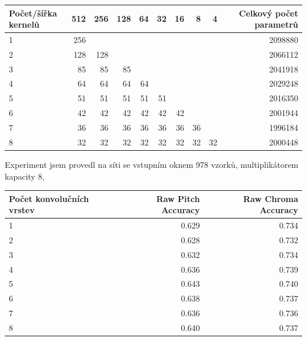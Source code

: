    \begin{tabular}{lrrrrrrrrr}
    \toprule
    Počet/šířka kernelů & 512 & 256 & 128 & 64 & 32 & 16 & 8  & 4  & Celkový počet parametrů  \\
    \midrule
    1                   & 256 &     &     &    &    &    &    &    & 2098880 \\
    2                   & 128 & 128 &     &    &    &    &    &    & 2066112 \\
    3                   & 85  & 85  & 85  &    &    &    &    &    & 2041918 \\
    4                   & 64  & 64  & 64  & 64 &    &    &    &    & 2029248 \\
    5                   & 51  & 51  & 51  & 51 & 51 &    &    &    & 2016350 \\
    6                   & 42  & 42  & 42  & 42 & 42 & 42 &    &    & 2001944 \\
    7                   & 36  & 36  & 36  & 36 & 36 & 36 & 36 &    & 1996184 \\
    8                   & 32  & 32  & 32  & 32 & 32 & 32 & 32 & 32 & 2000448 \\
    \bottomrule
    \end{tabular}

Experiment jsem provedl na síti se vstupním oknem 978 vzorků, multiplikátorem kapacity 8, 

    \begin{tabular}{lrr}
    \toprule
    Počet konvolučních vrstev &  Raw Pitch Accuracy &  Raw Chroma Accuracy \\
    \midrule
    1                         &               0.629 &                0.734 \\
    2                         &               0.628 &                0.732 \\
    3                         &               0.632 &                0.734 \\
    4                         &               0.636 &                0.739 \\
    5                         &               0.643 &                0.740 \\
    6                         &               0.638 &                0.737 \\
    7                         &               0.636 &                0.736 \\
    8                         &               0.640 &                0.737 \\
    \bottomrule
    \end{tabular}


